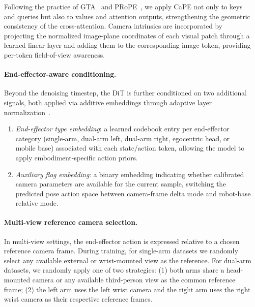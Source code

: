 Following the practice of GTA~\citep{miyato2024gta} and PRoPE~\citep{li2025cameras}, we apply CaPE not only to keys and queries but also to values and attention outputs, strengthening the geometric consistency of the cross-attention.
Camera intrinsics are incorporated by projecting the normalized image-plane coordinates of each visual patch through a learned linear layer and adding them to the corresponding image token, providing per-token field-of-view awareness.

\paragraph{End-effector-aware conditioning.}

Beyond the denoising timestep, the DiT is further conditioned on two additional signals, both applied via additive embeddings through adaptive layer normalization~\citep{peebles2023scalable}.
\begin{enumerate}[leftmargin=*,topsep=2pt,itemsep=1pt]
    \item \emph{End-effector type embedding}: a learned codebook entry per end-effector category (single-arm, dual-arm left, dual-arm right, egocentric head, or mobile base) associated with each state/action token, allowing the model to apply embodiment-specific action priors.
    \item \emph{Auxiliary flag embedding}: a binary embedding indicating whether calibrated camera parameters are available for the current sample, switching the predicted pose action space between camera-frame delta mode and robot-base relative mode.
\end{enumerate}

\paragraph{Multi-view reference camera selection.}
In multi-view settings, the end-effector action is expressed relative to a chosen reference camera frame.
During training, for single-arm datasets we randomly select any available external or wrist-mounted view as the reference. For dual-arm datasets, we randomly apply one of two strategies:
(1) both arms share a head-mounted camera or any available third-person view as the common reference frame;
(2) the left arm uses the left wrist camera and the right arm uses the right wrist camera as their respective reference frames.

